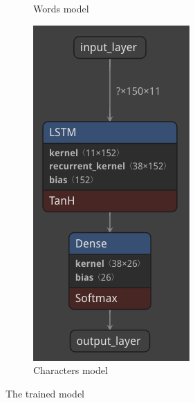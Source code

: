 \begin{figure}[h]
\begin{subfigure}[b]{0.2\textwidth}
		\caption{Words model}
		\label{fig:words_model}
	\end{subfigure}
	\begin{subfigure}[b]{0.2\textwidth}
		\includegraphics[width=\linewidth]{images/model_characters}
		\caption{Characters model}
		\label{fig:characters_model}
	\end{subfigure}
	\caption{The trained model}
	\label{fig:model}
\end{figure}

